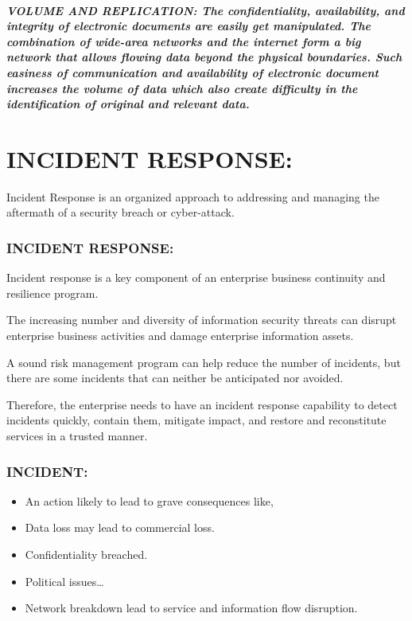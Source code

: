 \documentclass[10pt,british,english]{article}
\begin{document}
\subsubsection{VOLUME AND REPLICATION: The confidentiality, availability, and integrity
of electronic documents are easily get manipulated. The combination
of wide-area networks and the internet form a big network that allows
flowing data beyond the physical boundaries. Such easiness of communication
and availability of electronic document increases the volume of data
which also create difficulty in the identification of original and
relevant data.}

\part{INCIDENT RESPONSE: }

Incident Response is an organized approach to addressing and managing
the aftermath of a security breach or cyber-attack.

\section{INCIDENT RESPONSE:}

Incident response is a key component of an enterprise business continuity
and resilience program. 

The increasing number and diversity of information security threats
can disrupt enterprise business activities and damage enterprise information
assets. 

A sound risk management program can help reduce the number of incidents,
but there are some incidents that can neither be anticipated nor avoided. 

Therefore, the enterprise needs to have an incident response capability
to detect incidents quickly, contain them, mitigate impact, and restore
and reconstitute services in a trusted manner.

\section{INCIDENT: }
\begin{itemize}
\item An action likely to lead to grave consequences like,
\item Data loss may lead to commercial loss.
\item Confidentiality breached.
\item Political issues\dots{}
\item Network breakdown lead to service and information flow disruption.
\end{itemize}
\end{document}
